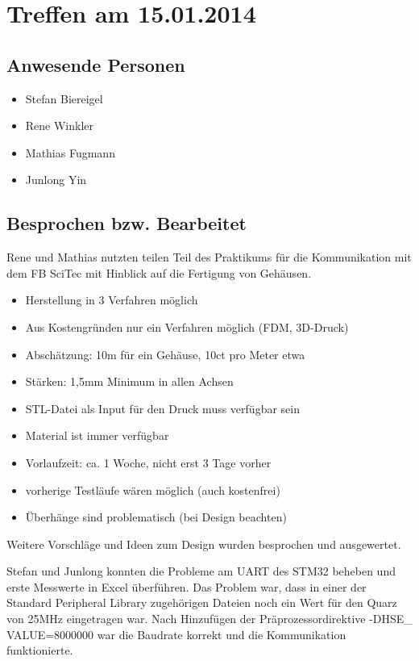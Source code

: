 \chapter{Treffen am 15.01.2014}
\section{Anwesende Personen}
\begin{itemize}
	\item Stefan Biereigel
	\item Rene Winkler
	\item Mathias Fugmann
	\item Junlong Yin
\end{itemize}

\section{Besprochen bzw. Bearbeitet}
Rene und Mathias nutzten teilen Teil des Praktikums für die Kommunikation mit dem FB SciTec mit Hinblick auf die Fertigung von Gehäusen.
\begin{itemize}
	\item Herstellung in 3 Verfahren möglich
	\item Aus Kostengründen nur ein Verfahren möglich (FDM, 3D-Druck)
	\item Abschätzung: 10m für ein Gehäuse, 10ct pro Meter etwa
	\item Stärken: 1,5mm Minimum in allen Achsen
	\item STL-Datei als Input für den Druck muss verfügbar sein
	\item Material ist immer verfügbar
	\item Vorlaufzeit: ca. 1 Woche, nicht erst 3 Tage vorher
	\item vorherige Testläufe wären möglich (auch kostenfrei)
	\item Überhänge sind problematisch (bei Design beachten)
\end{itemize}

Weitere Vorschläge und Ideen zum Design wurden besprochen und ausgewertet.

Stefan und Junlong konnten die Probleme am UART des STM32 beheben und erste Messwerte in Excel überführen. Das Problem war, dass in einer der Standard Peripheral Library zugehörigen Dateien noch ein Wert für den Quarz von 25MHz eingetragen war. Nach Hinzufügen der Präprozessordirektive -DHSE\_ VALUE=8000000 war die Baudrate korrekt und die Kommunikation funktionierte.